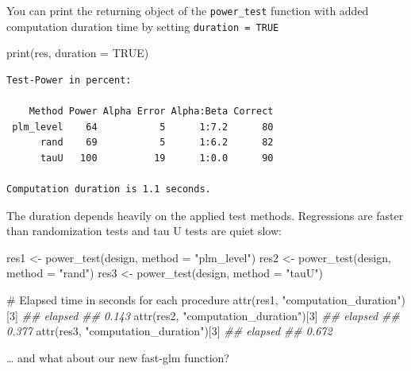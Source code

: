 \documentclass[
  letterpaper,
  DIV=11,
  numbers=noendperiod]{scrreprt}
\newenvironment{Shaded}{\begin{snugshade}}{\end{snugshade}}
\newcommand{\AttributeTok}[1]{\textcolor[rgb]{0.40,0.45,0.13}{#1}}
\newcommand{\CommentTok}[1]{\textcolor[rgb]{0.37,0.37,0.37}{#1}}
\newcommand{\ConstantTok}[1]{\textcolor[rgb]{0.56,0.35,0.01}{#1}}
\newcommand{\DecValTok}[1]{\textcolor[rgb]{0.68,0.00,0.00}{#1}}
\newcommand{\DocumentationTok}[1]{\textcolor[rgb]{0.37,0.37,0.37}{\textit{#1}}}
\newcommand{\FunctionTok}[1]{\textcolor[rgb]{0.28,0.35,0.67}{#1}}
\newcommand{\NormalTok}[1]{\textcolor[rgb]{0.00,0.23,0.31}{#1}}
\newcommand{\OtherTok}[1]{\textcolor[rgb]{0.00,0.23,0.31}{#1}}
\newcommand{\StringTok}[1]{\textcolor[rgb]{0.13,0.47,0.30}{#1}}
\begin{document}
You can print the returning object of the \texttt{power\_test} function
with added computation duration time by setting
\texttt{duration\ =\ TRUE}

\begin{Shaded}
\begin{Highlighting}[]
\FunctionTok{print}\NormalTok{(res, }\AttributeTok{duration =} \ConstantTok{TRUE}\NormalTok{)}
\end{Highlighting}
\end{Shaded}

\begin{verbatim}
Test-Power in percent:

    Method Power Alpha Error Alpha:Beta Correct
 plm_level    64           5      1:7.2      80
      rand    69           5      1:6.2      82
      tauU   100          19      1:0.0      90

Computation duration is 1.1 seconds.
\end{verbatim}

The duration depends heavily on the applied test methods. Regressions
are faster than randomization tests and tau U tests are quiet slow:

\begin{Shaded}
\begin{Highlighting}[]
\NormalTok{res1 }\OtherTok{\textless{}{-}} \FunctionTok{power\_test}\NormalTok{(design, }\AttributeTok{method =} \StringTok{"plm\_level"}\NormalTok{)}
\NormalTok{res2 }\OtherTok{\textless{}{-}} \FunctionTok{power\_test}\NormalTok{(design, }\AttributeTok{method =} \StringTok{"rand"}\NormalTok{)}
\NormalTok{res3 }\OtherTok{\textless{}{-}} \FunctionTok{power\_test}\NormalTok{(design, }\AttributeTok{method =} \StringTok{"tauU"}\NormalTok{)}

\CommentTok{\# Elapsed time in seconds for each procedure}
\FunctionTok{attr}\NormalTok{(res1, }\StringTok{"computation\_duration"}\NormalTok{)[}\DecValTok{3}\NormalTok{]}
\DocumentationTok{\#\# elapsed }
\DocumentationTok{\#\#   0.143}
\FunctionTok{attr}\NormalTok{(res2, }\StringTok{"computation\_duration"}\NormalTok{)[}\DecValTok{3}\NormalTok{]}
\DocumentationTok{\#\# elapsed }
\DocumentationTok{\#\#   0.377}
\FunctionTok{attr}\NormalTok{(res3, }\StringTok{"computation\_duration"}\NormalTok{)[}\DecValTok{3}\NormalTok{]}
\DocumentationTok{\#\# elapsed }
\DocumentationTok{\#\#   0.672}
\end{Highlighting}
\end{Shaded}

\ldots{} and what about our new fast-glm function?
\end{document}
